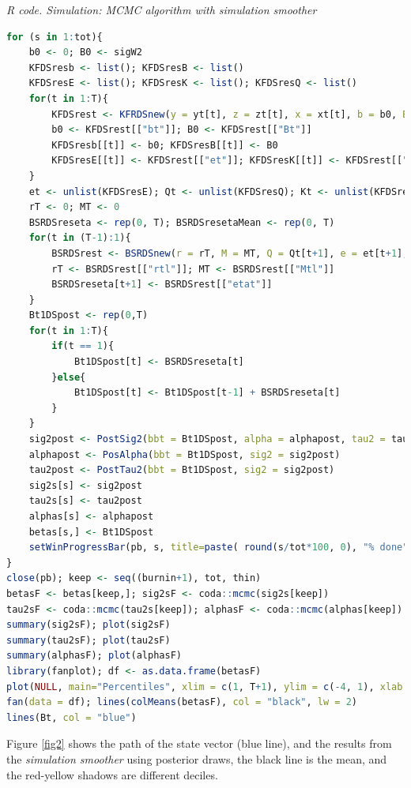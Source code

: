 \begin{enumerate}[leftmargin=*]
\begin{tcolorbox}[enhanced,width=4.67in,center upper,
	fontupper=\large\bfseries,drop shadow southwest,sharp corners]
	\textit{R code. Simulation: MCMC algorithm with simulation smoother}
	\begin{VF}
		\begin{lstlisting}[language=R]
for (s in 1:tot){
	b0 <- 0; B0 <- sigW2
	KFDSresb <- list(); KFDSresB <- list()
	KFDSresE <- list(); KFDSresK <- list(); KFDSresQ <- list()
	for(t in 1:T){
		KFDSrest <- KFRDSnew(y = yt[t], z = zt[t], x = xt[t], b = b0, B = B0, alpha = alphapost, tau2 = tau2post)
		b0 <- KFDSrest[["bt"]]; B0 <- KFDSrest[["Bt"]]
		KFDSresb[[t]] <- b0; KFDSresB[[t]] <- B0
		KFDSresE[[t]] <- KFDSrest[["et"]]; KFDSresK[[t]] <- KFDSrest[["Kt"]]; KFDSresQ[[t]] <- KFDSrest[["qt"]]
	}
	et <- unlist(KFDSresE); Qt <- unlist(KFDSresQ); Kt <- unlist(KFDSresK)
	rT <- 0; MT <- 0
	BSRDSreseta <- rep(0, T); BSRDSresetaMean <- rep(0, T)
	for(t in (T-1):1){
		BSRDSrest <- BSRDSnew(r = rT, M = MT, Q = Qt[t+1], e = et[t+1], K = Kt[t+1], x = xt[t+1], sig2 = sig2post, tau2 = tau2post)
		rT <- BSRDSrest[["rtl"]]; MT <- BSRDSrest[["Mtl"]]
		BSRDSreseta[t+1] <- BSRDSrest[["etat"]]
	}
	Bt1DSpost <- rep(0,T)
	for(t in 1:T){
		if(t == 1){
			Bt1DSpost[t] <- BSRDSreseta[t]
		}else{
			Bt1DSpost[t] <- Bt1DSpost[t-1] + BSRDSreseta[t]
		}
	}
	sig2post <- PostSig2(bbt = Bt1DSpost, alpha = alphapost, tau2 = tau2post)
	alphapost <- PosAlpha(bbt = Bt1DSpost, sig2 = sig2post)
	tau2post <- PostTau2(bbt = Bt1DSpost, sig2 = sig2post)
	sig2s[s] <- sig2post
	tau2s[s] <- tau2post
	alphas[s] <- alphapost
	betas[s,] <- Bt1DSpost
	setWinProgressBar(pb, s, title=paste( round(s/tot*100, 0), "% done"))
}
close(pb); keep <- seq((burnin+1), tot, thin)
betasF <- betas[keep,]; sig2sF <- coda::mcmc(sig2s[keep])
tau2sF <- coda::mcmc(tau2s[keep]); alphasF <- coda::mcmc(alphas[keep])
summary(sig2sF); plot(sig2sF)
summary(tau2sF); plot(tau2sF)
summary(alphasF); plot(alphasF)
library(fanplot); df <- as.data.frame(betasF)
plot(NULL, main="Percentiles", xlim = c(1, T+1), ylim = c(-4, 1), xlab = "Time", ylab = TeX("$\\beta_{t1}$"))
fan(data = df); lines(colMeans(betasF), col = "black", lw = 2)
lines(Bt, col = "blue")
\end{lstlisting}
	\end{VF}
\end{tcolorbox} 

Figure \ref{fig2} shows the path of the state vector (blue line), and the results from the \textit{simulation smoother} using posterior draws, the black line is the mean, and the red-yellow shadows are different deciles.


\end{enumerate}
